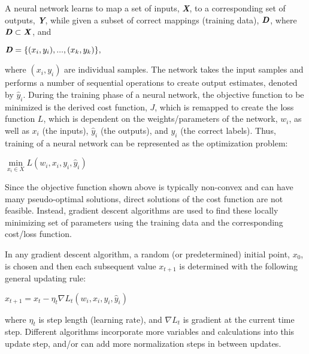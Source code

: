 A neural network learns to map a set of inputs, \textbf{\textit{X}}, to a corresponding set of outputs, \textbf{\textit{Y}}, while given a subset of correct mappings (training data), $\textbf{\textit{D}}$, where $\textbf{\textit{D}} \subset \textbf{\textit{X}}$, and
\begin{center}
$\textbf{\textit{D}} = \{(x_i,y_i),...,(x_k,y_k)\},$
\end{center}
where $(x_i,y_i)$ are individual samples. The network takes the input samples and performs a number of sequential operations to create output estimates, denoted by $\hat y_i$. During the training phase of a neural network, the objective function to be minimized is the derived cost function, $J$, which is remapped to create the loss function $L$, which is dependent on the weights/parameters of the network, $w_i$, as well as $x_i$ (the inputs), $\hat y_i$ (the outputs), and $y_i$ (the correct labels). Thus, training of a neural network can be represented as the optimization problem:

\begin{center}
$\min\limits_{x_i \in X} L(w_i,x_i,y_i,\hat y_i)$
\end{center}

Since the objective function shown above is typically non-convex and can have many pseudo-optimal solutions, direct solutions of the cost function are not feasible. Instead, gradient descent algorithms are used to find these locally minimizing set of parameters using the training data and the corresponding cost/loss function.

In any gradient descent algorithm, a random (or predetermined) initial point, $x_0$, is chosen and then each subsequent value $x_{t+1}$ is determined with the following general updating rule:
\begin{center}
$x_{t+1} = x_t - \eta_t \nabla L_t(w_i,x_i,y_i,\hat y_i) $
\end{center} 
where $\eta_t$ is step length (learning rate), and $\nabla L_t$ is gradient at the current time step. Different algorithms incorporate more variables and calculations into this update step, and/or can add more normalization steps in between updates.

